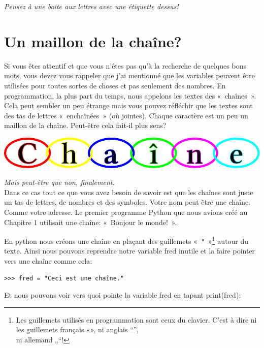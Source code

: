 \emph{Pensez à une boite aux lettres avec une étiquette dessus!}



\section{Un maillon de la chaîne?}

Si vous êtes attentif et que vous n'êtes pas qu'à la recherche de quelques bons mots, vous devez vous rappeler que j'ai mentionné que les variables peuvent être utilisées  pour toutes sortes de choses et pas seulement des nombres.
En programmation, la plus part du temps, nous appelons les textes des «~chaînes~». Cela peut sembler un peu étrange mais vous pouvez réfléchir que les textes sont des tas de lettres «~enchaînées~» (où jointes). Chaque caractère est un peu un maillon de la chaîne. Peut-être cela fait-il plus sens?\\
\begin{center}
\includegraphics[scale=1]{images/chaine.pdf} 
\end{center}

\emph{Mais peut-être que non, finalement.}\\


Dans ce cas tout ce que vous avez besoin de savoir est que les chaînes sont juste un tas de lettres, de nombres et 
 des symboles. Votre nom peut être une chaîne. Comme votre adresse. Le premier programme Python que nous avions créé au Chapitre 1 utilisait une chaîne: «~Bonjour le monde!~». 


En python nous créons une chaîne en plaçant des guillemets «~\texttt{"}~»\footnote{Les guillemets utilisés en programmation sont ceux du clavier. C'est à dire ni les guillemets français «», ni anglais “”,\\ ni allemand  „“!} autour du texte. Ainsi nous pouvons reprendre notre variable 
fred inutile et la faire pointer vers une chaîne comme cela:

\begin{Verbatim}[frame=single,rulecolor=\color{mbleu}, label=à taper]
>>> fred = "Ceci est une chaîne."
\end{Verbatim}

Et nous pouvons voir vers quoi pointe la variable fred en tapant print(fred):

